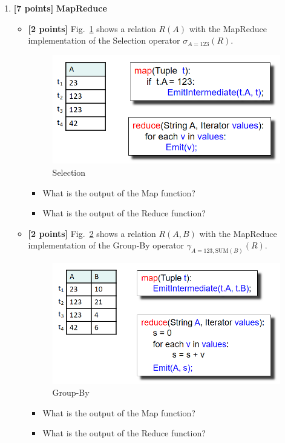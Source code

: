 \documentclass[10pt]{article}
\begin{document}
\begin{enumerate}
	\item \textbf{[7 points]} \textbf{MapReduce} \\
	      \begin{itemize}
		      \item[(a)]  \textbf{[2 points]}  Fig.~\ref{mr1} shows a relation $R(A)$ with the MapReduce implementation of the Selection operator $\sigma_{A=123}(R)$.
		            \begin{figure}[H]
			            \centering
			            \includegraphics[width=0.5\linewidth]{mr_selection}
			            \caption{Selection}
			            \label{mr1}
		            \end{figure}
		            \begin{itemize}
			            \item[(1)] What is the output of the Map function?
			            \item[(2)] What is the output of the Reduce function? \\
		            \end{itemize}
		      \item[(b)] \textbf{[2 points]}  Fig.~\ref{mr2} shows a relation $R(A,B)$ with the MapReduce implementation of the Group-By operator $\gamma_{A=123,\text{SUM} (B)}(R)$.
		            \begin{figure}[H]
			            \centering
			            \includegraphics[width=0.5\linewidth]{mr_group}
			            \caption{Group-By}
			            \label{mr2}
		            \end{figure}
		            \begin{itemize}
			            \item[(1)] What is the output of the Map function?
			            \item[(2)] What is the output of the Reduce function? \\

\end{itemize}
\end{itemize}
\end{enumerate}
\end{document}
